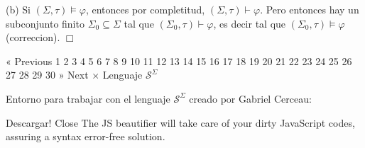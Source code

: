 (b) Si \((\Sigma ,\tau )\models \varphi \), entonces por completitud, \((\Sigma ,\tau )\vdash \varphi \). Pero entonces hay un subconjunto finito \(\Sigma _{0}\subseteq \Sigma \) tal que \((\Sigma _{0},\tau )\vdash \varphi \), es decir tal que \((\Sigma _{0},\tau )\models \varphi \) (correccion). \(\Box\)

« Previous
1
2
3
4
5
6
7
8
9
10
11
12
13
14
15
16
17
18
19
20
21
22
23
24
25
26
27
28
29
30
» Next
×
Lenguaje \(\mathcal{S}^{\Sigma }\)

Entorno para trabajar con el lenguaje \(\mathcal{S}^{\Sigma }\) creado por Gabriel Cerceau:

Descargar!
Close
The JS beautifier will take care of your dirty JavaScript codes, assuring a syntax error-free solution.
